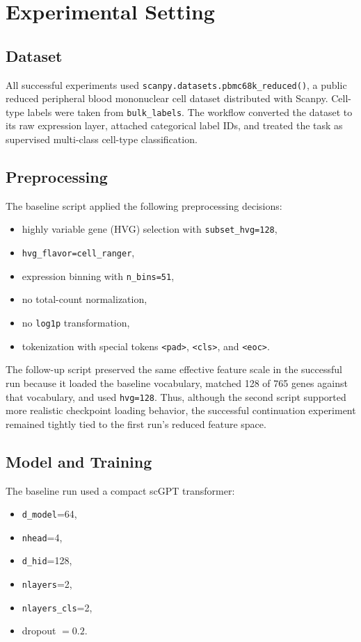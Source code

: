\documentclass[11pt]{article}
\begin{document}
\section{Experimental Setting}
\subsection{Dataset}
All successful experiments used \texttt{scanpy.datasets.pbmc68k\_reduced()}, a public reduced peripheral blood mononuclear cell dataset distributed with Scanpy. Cell-type labels were taken from \texttt{bulk\_labels}. The workflow converted the dataset to its raw expression layer, attached categorical label IDs, and treated the task as supervised multi-class cell-type classification.

\subsection{Preprocessing}
The baseline script applied the following preprocessing decisions:
\begin{itemize}
    \item highly variable gene (HVG) selection with \texttt{subset\_hvg=128},
    \item \texttt{hvg\_flavor=cell\_ranger},
    \item expression binning with \texttt{n\_bins=51},
    \item no total-count normalization,
    \item no \texttt{log1p} transformation,
    \item tokenization with special tokens \texttt{<pad>}, \texttt{<cls>}, and \texttt{<eoc>}.
\end{itemize}

The follow-up script preserved the same effective feature scale in the successful run because it loaded the baseline vocabulary, matched 128 of 765 genes against that vocabulary, and used \texttt{hvg=128}. Thus, although the second script supported more realistic checkpoint loading behavior, the successful continuation experiment remained tightly tied to the first run's reduced feature space.

\subsection{Model and Training}
The baseline run used a compact scGPT transformer:
\begin{itemize}
    \item \texttt{d\_model}=64,
    \item \texttt{nhead}=4,
    \item \texttt{d\_hid}=128,
    \item \texttt{nlayers}=2,
    \item \texttt{nlayers\_cls}=2,
    \item dropout $=0.2$.
\end{itemize}
\end{document}
